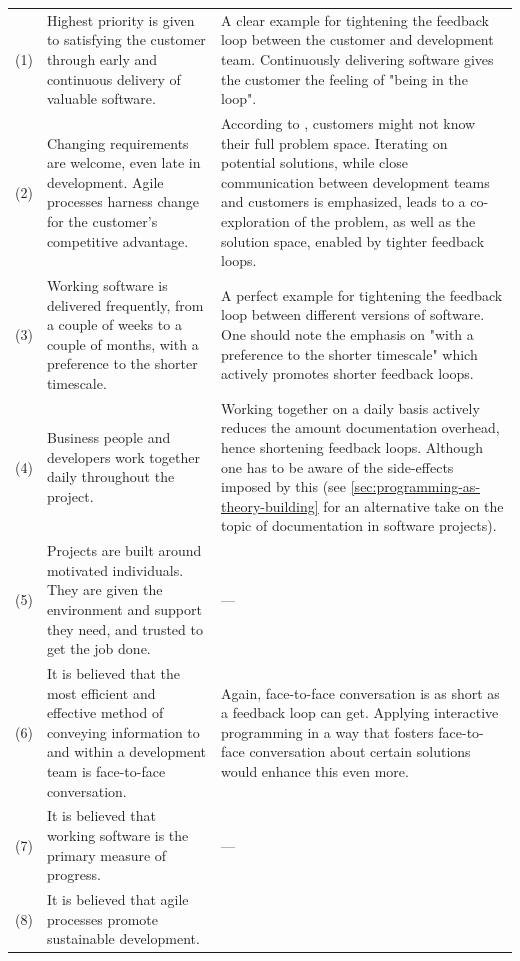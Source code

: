 \begin{block}
\begin{ThreePartTable}
\begin{longtable}{@{}cp{}p{}@{}}
    (1) &
    Highest priority is given to satisfying the customer through early and continuous delivery of valuable software. &
    A clear example for tightening the feedback loop between the customer and development team.
    Continuously delivering software gives the customer the feeling of "being in the loop".
    \\
    (2) &
    Changing requirements are welcome, even late in development. Agile processes harness change for the customer’s competitive advantage. &
    According to \cite{van_der_aalst_historical_2008}, customers might not know their full problem space.
    Iterating on potential solutions, while close communication between development teams and customers is emphasized, leads to a co-exploration of the problem, as well as the solution space, enabled by tighter feedback loops.
    \\
    (3) &
    Working software is delivered frequently, from a couple of weeks to a couple of months, with a preference to the shorter timescale. &
    A perfect example for tightening the feedback loop between different versions of software.
    One should note the emphasis on "with a preference to the shorter timescale" which actively promotes shorter feedback loops.
    \\
    (4) &
    Business people and developers work together daily throughout the project. &
    Working together on a daily basis actively reduces the amount documentation overhead, hence shortening feedback loops.
    Although one has to be aware of the side-effects imposed by this (see \ref{sec:programming-as-theory-building} for an alternative take on the topic of documentation in software projects).
    \\
    (5) &
    Projects are built around motivated individuals.
    They are given the environment and support they need, and trusted to get the job done. &
    ---
    \\
    (6) &
    It is believed that the most efficient and effective method of conveying information to and within a development team is face-to-face conversation. &
    Again, face-to-face conversation is as short as a feedback loop can get.
    Applying interactive programming in a way that fosters face-to-face conversation about certain solutions would enhance this even more.
    \\
    (7) &
    It is believed that working software is the primary measure of progress.&
    ---
    \\
    (8) &
    It is believed that agile processes promote sustainable development.

\end{longtable}
\end{ThreePartTable}
\end{block}
